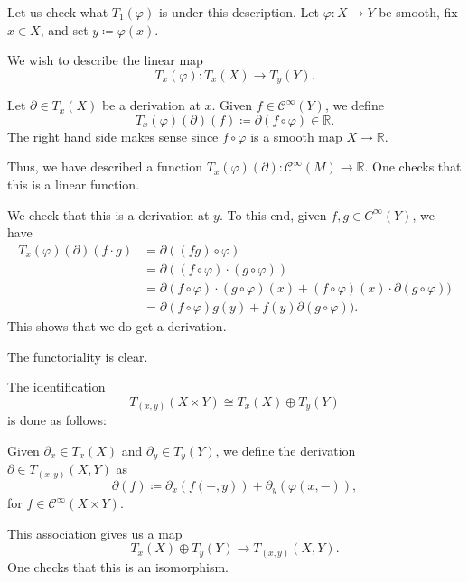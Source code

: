 \documentclass[12pt]{article}
\begin{document}
\begin{ex}
	Let us check what $T_{1}(\varphi)$ is under this description. 
	Let $\varphi \colon X \to Y$ be smooth, fix $x \in X$, and set $y \coloneqq \varphi(x)$. 

	We wish to describe the linear map
	\begin{equation*} 
		T_{x}(\varphi) \colon T_{x}(X) \to T_{y}(Y).
	\end{equation*}

	Let $\partial \in T_{x}(X)$ be a derivation at $x$. 
	Given $f \in \mathcal{C}^{\infty}(Y)$, we define
	\begin{equation*} 
		T_{x}(\varphi)(\partial)(f) \coloneqq \partial(f \circ \varphi) \in \mathbb{R}.
	\end{equation*}
	The right hand side makes sense since $f \circ \varphi$ is a smooth map $X \to \mathbb{R}$. 

	Thus, we have described a function $T_{x}(\varphi)(\partial) \colon \mathcal{C}^{\infty}(M) \to \mathbb{R}$. 
	One checks that this is a linear function.

	We check that this is a derivation at $y$. To this end, given $f, g \in C^{\infty}(Y)$, we have
	\begin{align*} 
		T_{x}(\varphi)(\partial)(f \cdot g) &= \partial((fg) \circ \varphi) \\
		&= \partial((f \circ \varphi) \cdot (g \circ \varphi)) \\
		&= \partial(f \circ \varphi) \cdot (g \circ \varphi)(x) + (f \circ \varphi)(x) \cdot \partial(g \circ \varphi)) \\ 
		&= \partial(f \circ \varphi) g(y) + f(y) \partial(g \circ \varphi)). 
	\end{align*}
	This shows that we do get a derivation.

	The functoriality is clear.
\end{ex}

\begin{ex}
	The identification
	\begin{equation*} 
		T_{(x, y)}(X \times Y) \cong T_{x}(X) \oplus T_{y}(Y)
	\end{equation*}
	is done as follows:

	Given $\partial_{x} \in T_{x}(X)$ and $\partial_{y} \in T_{y}(Y)$, we define the derivation $\partial \in T_{(x, y)}(X, Y)$ as
	\begin{equation*} 
		\partial(f) \coloneqq \partial_{x}(f(-, y)) + \partial_{y}(\varphi(x, -)),
	\end{equation*}
	for $f \in \mathcal{C}^{\infty}(X \times Y)$.

	This association gives us a map
	\begin{equation*} 
		T_{x}(X) \oplus T_{y}(Y) \to T_{(x, y)}(X, Y).
	\end{equation*}
	One checks that this is an isomorphism.
\end{ex}
\end{document}
